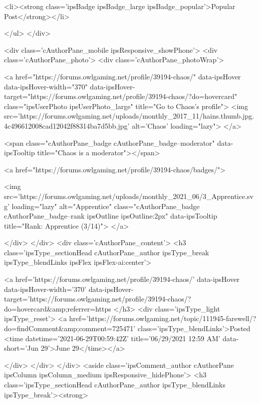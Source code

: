 				
				
				
					<li><strong class='ipsBadge ipsBadge_large ipsBadge_popular'>Popular Post</strong></li>
				
			</ul>
		</div>
	

	<div class='cAuthorPane_mobile ipsResponsive_showPhone'>
		<div class='cAuthorPane_photo'>
			<div class='cAuthorPane_photoWrap'>
				


	<a href="https://forums.owlgaming.net/profile/39194-chaos/" data-ipsHover data-ipsHover-width="370" data-ipsHover-target="https://forums.owlgaming.net/profile/39194-chaos/?do=hovercard" class="ipsUserPhoto ipsUserPhoto_large" title="Go to Chaos's profile">
		<img src='https://forums.owlgaming.net/uploads/monthly_2017_11/hains.thumb.jpg.4c496612008cad12042f88314ba7d5bb.jpg' alt='Chaos' loading="lazy">
	</a>

				
				<span class="cAuthorPane_badge cAuthorPane_badge--moderator" data-ipsTooltip title="Chaos is a moderator"></span>
				
				
					<a href="https://forums.owlgaming.net/profile/39194-chaos/badges/">
						
<img src='https://forums.owlgaming.net/uploads/monthly_2021_06/3_Apprentice.svg' loading="lazy" alt="Apprentice" class="cAuthorPane_badge cAuthorPane_badge--rank ipsOutline ipsOutline:2px" data-ipsTooltip title="Rank: Apprentice (3/14)">
					</a>
				
			</div>
		</div>
		<div class='cAuthorPane_content'>
			<h3 class='ipsType_sectionHead cAuthorPane_author ipsType_break ipsType_blendLinks ipsFlex ipsFlex-ai:center'>
				


<a href='https://forums.owlgaming.net/profile/39194-chaos/' data-ipsHover data-ipsHover-width='370' data-ipsHover-target='https://forums.owlgaming.net/profile/39194-chaos/?do=hovercard&amp;referrer=https%
			</h3>
			<div class='ipsType_light ipsType_reset'>
				<a href='https://forums.owlgaming.net/topic/111945-farewell/?do=findComment&amp;comment=725471' class='ipsType_blendLinks'>Posted <time datetime='2021-06-29T00:59:42Z' title='06/29/2021 12:59  AM' data-short='Jun 29'>June 29</time></a>
				
			</div>
		</div>
	</div>
	<aside class='ipsComment_author cAuthorPane ipsColumn ipsColumn_medium ipsResponsive_hidePhone'>
		<h3 class='ipsType_sectionHead cAuthorPane_author ipsType_blendLinks ipsType_break'><strong>


